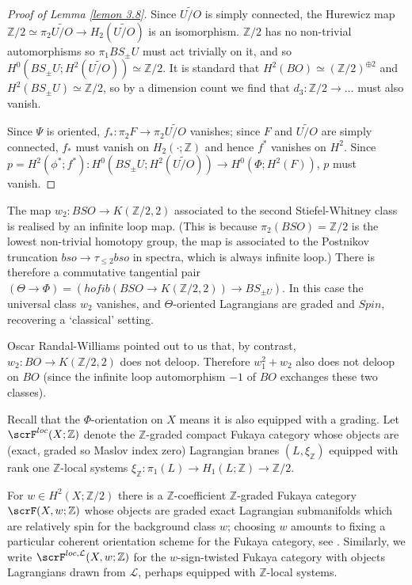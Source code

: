 \documentclass{TPmod}
\def\bZ{\mathbb{Z}}
\newcommand{\cL}{\mathcal{L}}
\def\bZ{\mathbb{Z}}
\renewcommand{\cong}{\simeq}
\numberwithin{equation}{section}
\begin{document}
\begin{proof}[{Proof of Lemma \ref{lemon 3.8}}]
    Since $\widetilde{U/O}$ is simply connected, the Hurewicz map $\bZ/2 \cong \pi_2 \widetilde{U/O} \to H_2(\widetilde{U/O})$ is an isomorphism. $\bZ/2$ has no non-trivial automorphisms so $\pi_1 BS_\pm U$ must act trivially on it, and so $H^0(BS_\pm U; H^2(\widetilde{U/O})) \cong \bZ/2$. It is standard that $H^2(BO) \cong (\bZ/2)^{\oplus 2}$ and $H^2(BS_\pm U) \cong \bZ/2$, so by a dimension count we find that $d_3: \bZ/2 \to \ldots$ must also vanish.

    Since $\Psi$ is oriented, $f_*: \pi_2 F \to \pi_2 \widetilde{U/O}$ vanishes; since $F$ and $\widetilde{U/O}$ are simply connected, $f_*$ must vanish on $H_2(\cdot; \bZ)$ and hence $f^*$ vanishes on $H^2$. Since $p = H^2(\phi^*; f^*): H^0(BS_\pm U; H^2(\widetilde{U/O})) \to H^0(\Phi; H^2(F))$, $p$ must vanish.
\end{proof}

\begin{ex}
     The map $w_2: BSO \to K(\bZ/2,2)$ associated to the second Stiefel-Whitney class is realised by an infinite loop map. (This is because $\pi_2(BSO) = \bZ/2$ is the lowest non-trivial homotopy group, the map is associated to the Postnikov truncation $bso \to \tau_{\leq 2} bso$ in spectra, which is always infinite loop.) There is therefore a commutative tangential pair $(\Theta \to \Phi) = (hofib(BSO \to K(\bZ/2,2)) \to BS_{\pm U})$. In this case the universal class $w_2$ vanishes, and $\Theta$-oriented Lagrangians are graded and $Spin$, recovering a `classical' setting. 
\end{ex}


\begin{rmk}
    Oscar Randal-Williams pointed out to us that, by contrast, $w_2: BO \to K(\bZ/2,2)$ does not deloop. Therefore $w_1^2+w_2$ also does not deloop on $BO$ (since the infinite loop automorphism $-1$ of $BO$ exchanges these two classes).
\end{rmk}



Recall that the $\Phi$-orientation on $X$ means it is also equipped with a grading. Let $\scrF^{loc}(X;\bZ)$ denote the $\bZ$-graded compact Fukaya category whose objects are (exact, graded so Maslov index zero) Lagrangian branes $(L,\xi_\bZ)$ equipped with rank one $\bZ$-local systems $\xi_{\bZ}: \pi_1(L)\to H_1(L;\bZ) \to \bZ/2$.



For $w \in H^2(X;\bZ/2)$ there is a $\bZ$-coefficient $\bZ$-graded Fukaya category $\scrF(X,w;\bZ)$ whose objects are graded exact Lagrangian submanifolds which are relatively spin for the background class $w$; choosing $w$ amounts to fixing a particular coherent orientation scheme for the Fukaya category, see \cite[Section 8]{Seidel:book}. Similarly, we write $\scrF^{loc,\cL}(X,w;\bZ)$ for the $w$-sign-twisted Fukaya category with objects Lagrangians drawn from $\cL$, perhaps equipped with $\bZ$-local systems.
\end{document}
